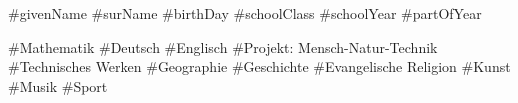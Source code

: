 \documentclass[11pt,a4paper]{article}
\begin{document}
#givenName
#surName
#birthDay
#schoolClass
#schoolYear
#partOfYear

#Mathematik
#Deutsch
#Englisch
#Projekt: Mensch-Natur-Technik
#Technisches Werken
#Geographie
#Geschichte
#Evangelische Religion
#Kunst
#Musik
#Sport
\end{document}
